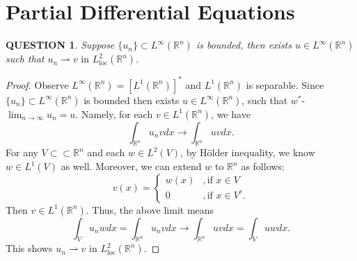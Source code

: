 \documentclass[12pt]{article}
\renewcommand{\(}{\left(}%
\renewcommand{\)}{\right)}%
\renewcommand{\[}{\left[}%
\renewcommand{\]}{\right]}%
\renewcommand{\r}{\mathbb{R}}
\newtheorem{question}{QUESTION}[section]}
\newtheorem{proof}{Proof.}}
\begin{document}
  \section{Partial Differential Equations}
  \begin{question}
   Suppose $\{u_n\}\subset L^\infty(\r^n)$ is bounded, then exists $u\in L^\infty(\r^n)$ such that $u_n\rightharpoonup v \text{ in }L^2_\mathrm{loc}(\r^n)$.
  \end{question}
  \begin{proof}
   Observe $L^\infty(\r^n)=[L^1(\r^n)]^*$ and $L^1(\r^n)$ is separable. Since $\{u_n\}\subset L^\infty(\r^n)$ is bounded then exists $u\in L^\infty(\r^n)$, such that $w^*$-$\lim_{n\to\infty}u_n=u$. Namely, for each $v\in L^1(\r^n)$, we have
   \begin{equation*}
    \int_{\r^n}u_nvdx\to \int_{\r^n}uvdx.
   \end{equation*}
   For any $V\subset\subset \r^n$ and each $w\in L^2(V)$, by H\"older inequality, we know $w\in L^1(V)$ as well. Moreover, we can extend $w$ to $\r^n$ as follows:
   \begin{equation*}
    v(x)=
    \begin{cases}
     w(x)&,\mbox{if }x\in V\\
     0&,\mbox{if }x\in V^c.
    \end{cases}
   \end{equation*}
   Then $v\in L^1(\r^n)$. Thus, the above limit means
   \begin{equation*}
    \int_{V}u_nwdx =\int_{\r^n}u_nvdx\to \int_{\r^n}uvdx=\int_Vuwdx.
   \end{equation*}
   This shows $u_n\rightharpoonup v \text{ in }L^2_\mathrm{loc}(\r^n)$.
  \end{proof}
\end{document}
